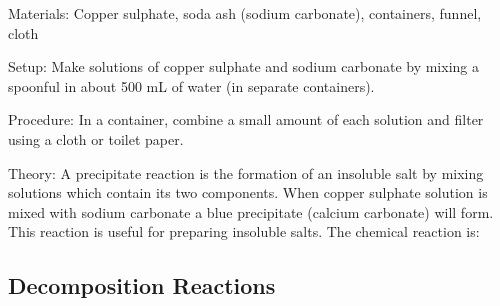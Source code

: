\begin{multicols}{2}
\begin{description*}
\item[Materials:]{Copper sulphate, soda ash (sodium carbonate), containers, funnel, cloth}
\item[Setup:]{Make solutions of copper sulphate and sodium carbonate by mixing a spoonful in about 500 mL of water (in separate containers).}
\item[Procedure:]{In a container, combine a small amount of each solution and filter using a cloth or toilet paper.}
\item[Theory:]{A precipitate reaction is the formation of an insoluble salt by mixing solutions
which contain its two components. When copper sulphate solution is mixed with sodium carbonate a blue precipitate (calcium carbonate) will form. This reaction is useful for
preparing insoluble salts. The chemical reaction is:\\
 }
\end{description*}

\subsection{Decomposition Reactions}



\end{multicols}
